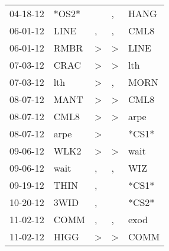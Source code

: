 \begin{supertabular}{p{0.07\textwidth}p{0.06\textwidth}p{0.02\textwidth}p{0.02\textwidth}p{0.06\textwidth}}
          04-18-12\textsuperscript{} &                            *OS2* &                  &                , &           HANG\textsuperscript{} \\
          06-01-12\textsuperscript{} &           LINE\textsuperscript{} &                , &                , &           CML8\textsuperscript{} \\
          06-01-12\textsuperscript{} &           RMBR\textsuperscript{} &     \textgreater &     \textgreater &           LINE\textsuperscript{} \\
          07-03-12\textsuperscript{} &           CRAC\textsuperscript{} &     \textgreater &     \textgreater &            lth\textsuperscript{} \\
          07-03-12\textsuperscript{} &            lth\textsuperscript{} &     \textgreater &                , &           MORN\textsuperscript{} \\
          08-07-12\textsuperscript{} &           MANT\textsuperscript{} &     \textgreater &     \textgreater &           CML8\textsuperscript{} \\
          08-07-12\textsuperscript{} &           CML8\textsuperscript{} &     \textgreater &     \textgreater &           arpe\textsuperscript{} \\
          08-07-12\textsuperscript{} &           arpe\textsuperscript{} &     \textgreater &                  &                            *CS1* \\
          09-06-12\textsuperscript{} &           WLK2\textsuperscript{} &     \textgreater &     \textgreater &           wait\textsuperscript{} \\
          09-06-12\textsuperscript{} &           wait\textsuperscript{} &                , &                , &            WIZ\textsuperscript{} \\
          09-19-12\textsuperscript{} &           THIN\textsuperscript{} &                , &                  &                            *CS1* \\
          10-20-12\textsuperscript{} &           3WID\textsuperscript{} &                , &                  &                            *CS2* \\
          11-02-12\textsuperscript{} &           COMM\textsuperscript{} &                , &                , &           exod\textsuperscript{} \\
          11-02-12\textsuperscript{} &           HIGG\textsuperscript{} &     \textgreater &     \textgreater &           COMM\textsuperscript{} \\

\end{supertabular}
